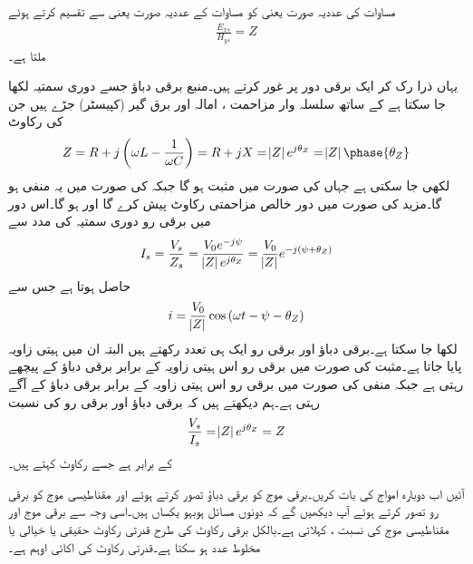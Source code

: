 مساوات  کی عددیہ صورت یعنی  کو مساوات  کے عددیہ صورت یعنی  سے تقسیم کرتے ہوئے
\begin{align}
\frac{E_{xs}}{H_{ys}}=Z
\end{align}
ملتا ہے۔

یہاں ذرا رک کر ایک برقی دور پر غور کرتے ہیں۔منبع برقی دباؤ  جسے دوری سمتیہ  لکھا جا سکتا ہے کے ساتھ سلسلہ وار مزاحمت ، امالہ  اور برق گیر (کپیسٹر)   جڑے ہیں جن کی رکاوٹ 
\begin{align*}
Z=R+j\left( \omega L -\frac{1}{\omega C}\right)=R+jX=\abs{Z} e^{j \theta_Z}=\abs{Z}\phase{\theta_Z}
\end{align*}
لکھی جا سکتی ہے  جہاں  کی صورت میں  مثبت ہو گا جبکہ  کی صورت میں یہ منفی ہو گا۔مزید  کی صورت میں دور خالص مزاحمتی رکاوٹ پیش کرے گا اور  ہو گا۔اس دور میں برقی رو دوری سمتیہ کی مدد سے
\begin{align*}
I_s=\frac{V_s}{Z_s}=\frac{V_0 e^{-j\psi}}{\abs{Z}e^{j \theta_Z}}=\frac{V_0}{\abs{Z}}e^{-j(\psi+\theta_Z)}
\end{align*}
حاصل ہوتا ہے جس سے
\begin{align*}
i=\frac{V_0}{\abs{Z}}\cos \left(\omega t -\psi-\theta_Z \right)
\end{align*}
لکھا جا سکتا ہے۔برقی دباؤ اور برقی رو ایک ہی تعدد رکھتے ہیں البتہ ان میں ہیتی زاویہ  پایا جاتا ہے۔مثبت  کی صورت میں برقی رو اس ہیتی زاویہ کے برابر برقی دباؤ کے پیچھے رہتی ہے جبکہ منفی  کی صورت میں برقی رو اس ہیتی زاویہ کے برابر برقی دباؤ کے آگے رہتی ہے۔ہم دیکھتے ہیں کہ برقی دباؤ اور برقی رو کی نسبت 
\begin{align*}
\frac{V_s}{I_s}=\abs{Z} e^{j \theta_Z}=Z
\end{align*}
کے برابر ہے جسے رکاوٹ کہتے ہیں۔

آئیں اب دوبارہ امواج کی بات کریں۔برقی موج کو برقی دباؤ تصور کرتے ہوئے اور مقناطیسی موج کو برقی رو تصور کرتے ہوئے آپ دیکھیں گے کہ دونوں مسائل ہوبہو یکساں ہیں۔اسی وجہ سے  برقی موج  اور مقناطیسی موج  کی نسبت  ،   کہلاتی ہے۔بالکل برقی رکاوٹ کی طرح قدرتی رکاوٹ حقیقی یا خیالی یا مخلوط عدد ہو سکتا ہے۔قدرتی رکاوٹ کی اکائی اوہم  ہے۔

